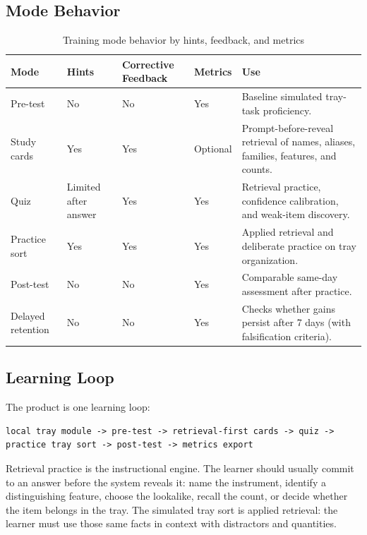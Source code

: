 \documentclass[10pt,a4paper]{article}
\begin{document}
\subsection{Mode Behavior}


\begin{table}[H]
\centering
\caption{Training mode behavior by hints, feedback, and metrics}
\label{tab:training-mode-behavior-by-hints-feedback-and-metrics}
\small\renewcommand{\arraystretch}{1.2}\setlength{\tabcolsep}{4pt}
\begin{tabularx}{\textwidth}{|>{\raggedright\arraybackslash}X|>{\raggedright\arraybackslash}X|>{\raggedright\arraybackslash}X|>{\raggedright\arraybackslash}X|>{\raggedright\arraybackslash}X|}
\hline
Mode & Hints & Corrective Feedback & Metrics & Use \\
\hline
Pre-test & No & No & Yes & Baseline simulated tray-task proficiency. \\
\hline
Study cards & Yes & Yes & Optional & Prompt-before-reveal retrieval of names, aliases, families, features, and counts. \\
\hline
Quiz & Limited after answer & Yes & Yes & Retrieval practice, confidence calibration, and weak-item discovery. \\
\hline
Practice sort & Yes & Yes & Yes & Applied retrieval and deliberate practice on tray organization. \\
\hline
Post-test & No & No & Yes & Comparable same-day assessment after practice. \\
\hline
Delayed retention & No & No & Yes & Checks whether gains persist after 7 days (with falsification criteria). \\
\hline
\end{tabularx}
\end{table}
\subsection{Learning Loop}


The product is one learning loop:
\begin{lstlisting}
local tray module -> pre-test -> retrieval-first cards -> quiz -> practice tray sort -> post-test -> metrics export
\end{lstlisting}
Retrieval practice is the instructional engine. The learner should usually
commit to an answer before the system reveals it: name the instrument, identify
a distinguishing feature, choose the lookalike, recall the count, or decide
whether the item belongs in the tray. The simulated tray sort is applied
retrieval: the learner must use those same facts in context with distractors
and quantities.
\end{document}
